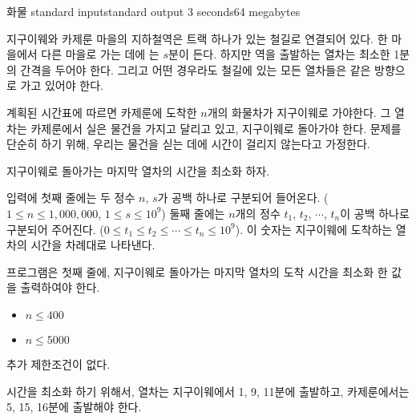 \begin{problem}{화물}
	{standard input}{standard output}
	{3 seconds}{64 megabytes}{}
	
	
	지구이웨와 카제룬 마을의 지하철역은 트랙 하나가 있는 철길로 연결되어 있다. 한 마을에서 다른 마을로 가는 데에 는 $s$분이 든다. 하지만 역을 출발하는 열차는 최소한 1분의 간격을 두어야 한다. 그리고 어떤 경우라도 철길에 있는 모든 열차들은 같은 방향으로 가고 있어야 한다.
	
	계획된 시간표에 따르면 카제룬에 도착한 $n$개의 화물차가 지구이웨로 가야한다. 그 열차는 카제룬에서 실은 물건을 가지고 달리고 있고, 지구이웨로 돌아가야 한다. 문제를 단순히 하기 위해, 우리는 물건을 싣는 데에 시간이 걸리지 않는다고 가정한다.
	
	지구이웨로 돌아가는 마지막 열차의 시간을 최소화 하자. 
	
	\InputFile
	
	입력에 첫째 줄에는 두 정수 $n$, $s$가 공백 하나로 구분되어 들어온다. ($1 \le n \le 1,000,000$, $1 \le s \le 10^9$) 둘째 줄에는 $n$개의 정수 $t_1$, $t_2$, $\cdots$, $t_n$이 공백 하나로 구분되어 주어진다. ($0 \le t_1 \le t_2 \le \cdots \le t_n \le 10^9$). 이 숫자는 지구이웨에 도착하는 열차의 시간을 차례대로 나타낸다. 
	
	
	\OutputFile
	
	프로그램은 첫째 줄에, 지구이웨로 돌아가는 마지막 열차의 도착 시간을 최소화 한 값을 출력하여야 한다.
	
	\begin{itemize}
		\item $n \le 400$
	\end{itemize}
	
	\begin{itemize}
		\item $n \le 5000$
	\end{itemize}
	
	
	추가 제한조건이 없다.
	
	\Examples
	
	\begin{example}
\end{example}

\Note


시간을 최소화 하기 위해서, 열차는 지구이웨에서 1, 9, 11분에 출발하고, 카제룬에서는 5, 15, 16분에 출발해야 한다.
	
\end{problem}

